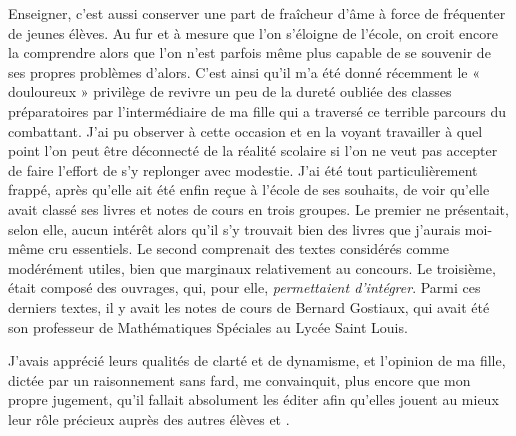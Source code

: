 Enseigner, c'est aussi conserver une part de fraîcheur d'âme à force de fréquenter de jeunes élèves. Au fur et à mesure que l'on s'éloigne de l'école, on croit encore la comprendre alors que l'on n'est parfois même plus capable de se souvenir de ses propres problèmes d'alors. C'est ainsi qu'il m'a été donné récemment le « douloureux » privilège de revivre un peu de la dureté oubliée des classes préparatoires par l'intermédiaire de ma fille qui a traversé ce terrible parcours du combattant. J'ai pu observer à cette occasion et en la voyant travailler à quel point l'on peut être déconnecté de la réalité scolaire si l'on ne veut pas accepter de faire l'effort de s'y replonger avec modestie. J'ai été tout particulièrement frappé, après qu'elle ait été enfin reçue à l'école de ses souhaits, de voir qu'elle avait classé ses livres et notes de cours en trois groupes. Le premier ne présentait, selon elle, aucun intérêt alors qu'il s'y trouvait bien des livres que j'aurais moi-même cru essentiels. Le second comprenait des textes considérés comme modérément utiles, bien que marginaux relativement au concours. Le troisième, était composé des ouvrages, qui, pour elle, \emph{permettaient d'intégrer}. Parmi ces derniers textes, il y avait les notes de cours de Bernard Gostiaux, qui avait été son professeur de Mathématiques Spéciales au Lycée Saint Louis.

J'avais apprécié leurs qualités de clarté et de dynamisme, et l'opinion de ma fille, dictée par un raisonnement sans fard, me convainquit, plus encore que mon propre jugement, qu'il fallait absolument les éditer afin qu'elles jouent au mieux leur rôle précieux auprès des autres élèves et .

